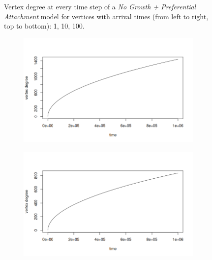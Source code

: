 \begin{figure}[ht]
\begin{subfigure}{.5\textwidth}
\end{subfigure}
\caption{Vertex degree at every time step of a \textit{No Growth + Preferential Attachment} model for vertices with arrival times (from left to right, top to bottom): 1, 10, 100.}
\label{fig:scaling_NG}
\end{figure}

\begin{figure}[ht]
\centering
\begin{subfigure}{.5\textwidth}
  \centering
  \includegraphics[width=\linewidth]{figures/scaling_BA/sc_ba_0.png}
\end{subfigure}%
\begin{subfigure}{.5\textwidth}
  \centering
  \includegraphics[width=\linewidth]{figures/scaling_BA/sc_ba_1.png}
\end{subfigure}
\begin{subfigure}{.5\textwidth}
  \centering

\end{subfigure}
\end{figure}
